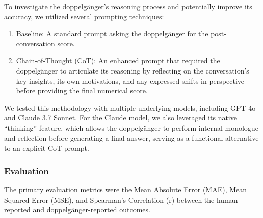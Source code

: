 
To investigate the doppelgänger's reasoning process and potentially improve its accuracy, we utilized several prompting techniques:

\begin{enumerate}
\item Baseline: A standard prompt asking the doppelgänger for the post-conversation score.

\item Chain-of-Thought (CoT): An enhanced prompt that required the doppelgänger to articulate its reasoning by reflecting on the conversation's key insights, its own motivations, and any expressed shifts in perspective—before providing the final numerical score.
\end{enumerate}

We tested this methodology with multiple underlying models, including GPT-4o and Claude 3.7 Sonnet. For the Claude model, we also leveraged its native ``thinking'' feature, which allows the doppelgänger to perform internal monologue and reflection before generating a final answer, serving as a functional alternative to an explicit CoT prompt.

\subsubsection{Evaluation}
The primary evaluation metrics were the Mean Absolute Error (MAE), Mean Squared Error (MSE), and Spearman's Correlation (r) between the human-reported and doppelgänger-reported outcomes.

